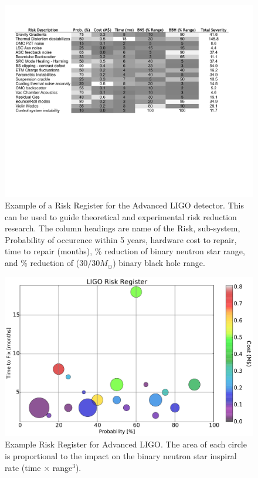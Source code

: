 \begin{figure}[h]
  \centering
\includegraphics[width=\columnwidth]{Figures/RiskRegister.pdf}
  \caption{Example of a Risk Register for the Advanced LIGO detector. This can be used
  to guide theoretical and experimental risk reduction research. The column headings are
  name of the Risk, sub-system, Probability of occurence within 5 years, hardware
  cost to repair, time to repair (months), \% reduction of binary neutron star range,
  and \% reduction of ($30/30 M_{\odot}$) binary black hole range.}
  \label{t:IDC:Risk}
\end{figure}

\begin{figure}[h]
  \centering
\includegraphics[width=\columnwidth]{Figures/Risk.pdf}
  \caption{Example Risk Register for Advanced LIGO. The area of each circle is
  proportional to the impact on the binary neutron star inspiral rate
  (time $\times$ range$^3$).}
  \label{fig:RiskBubbles}
\end{figure}


